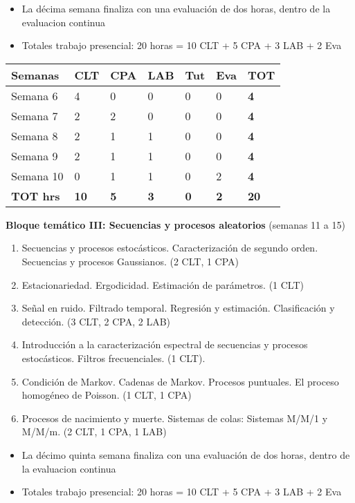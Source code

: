\documentclass[11pt]{article}
\providecommand{\tightlist}{%
      \setlength{\itemsep}{0pt}\setlength{\parskip}{0pt}}
\begin{document}
    \begin{itemize}
\tightlist
\item
  La décima semana finaliza con una evaluación de dos horas, dentro de
  la evaluacion continua
\item
  Totales trabajo presencial: 20 horas = 10 CLT + 5 CPA + 3 LAB + 2 Eva
\end{itemize}

    \begin{longtable}[]{@{}lllllll@{}}
\toprule
\textbf{Semanas} & \textbf{CLT} & \textbf{CPA} & \textbf{LAB} &
\textbf{Tut} & \textbf{Eva} & \textbf{TOT}\tabularnewline
\midrule
\endhead
Semana 6 & 4 & 0 & 0 & 0 & 0 & \textbf{4}\tabularnewline
Semana 7 & 2 & 2 & 0 & 0 & 0 & \textbf{4}\tabularnewline
Semana 8 & 2 & 1 & 1 & 0 & 0 & \textbf{4}\tabularnewline
Semana 9 & 2 & 1 & 1 & 0 & 0 & \textbf{4}\tabularnewline
Semana 10 & 0 & 1 & 1 & 0 & 2 & \textbf{4}\tabularnewline
\textbf{TOT hrs} & \textbf{10} & \textbf{5} & \textbf{3} & \textbf{0} &
\textbf{2} & \textbf{20}\tabularnewline
\bottomrule
\end{longtable}

    

    \textbf{Bloque temático III: Secuencias y procesos aleatorios} (semanas
11 a 15)

\begin{enumerate}
\def\labelenumi{\arabic{enumi}.}
\tightlist
\item
  Secuencias y procesos estocásticos. Caracterización de segundo orden.
  Secuencias y procesos Gaussianos. (2 CLT, 1 CPA)
\item
  Estacionariedad. Ergodicidad. Estimación de parámetros. (1 CLT)
\item
  Señal en ruido. Filtrado temporal. Regresión y estimación.
  Clasificación y detección. (3 CLT, 2 CPA, 2 LAB)
\item
  Introducción a la caracterización espectral de secuencias y procesos
  estocásticos. Filtros frecuenciales. (1 CLT).
\item
  Condición de Markov. Cadenas de Markov. Procesos puntuales. El proceso
  homogéneo de Poisson. (1 CLT, 1 CPA)
\item
  Procesos de nacimiento y muerte. Sistemas de colas: Sistemas M/M/1 y
  M/M/m. (2 CLT, 1 CPA, 1 LAB)
\end{enumerate}

    \begin{itemize}
\tightlist
\item
  La décimo quinta semana finaliza con una evaluación de dos horas,
  dentro de la evaluacion continua
\item
  Totales trabajo presencial: 20 horas = 10 CLT + 5 CPA + 3 LAB + 2 Eva
\end{itemize}
\end{document}
